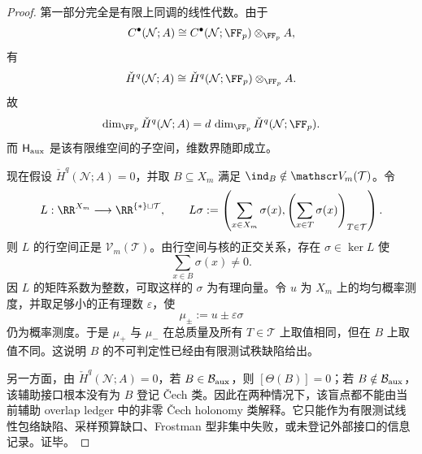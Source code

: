\begin{proof}
第一部分完全是有限上同调的线性代数。由于
\[
C^\bullet(\mathcal N;A)\cong C^\bullet(\mathcal N;\FF_p)\otimes_{\FF_p}A,
\]
有
\[
\check H^q(\mathcal N;A)\cong \check H^q(\mathcal N;\FF_p)\otimes_{\FF_p}A.
\]
故
\[
\dim_{\FF_p}\check H^q(\mathcal N;A)=d\,\dim_{\FF_p}\check H^q(\mathcal N;\FF_p).
\]
而 \(\mathsf H_{\rm aux}\) 是该有限维空间的子空间，维数界随即成立。

现在假设 \(\check H^q(\mathcal N;A)=0\)，并取 \(B\subseteq X_m\) 满足 \(\ind_B\notin\mathscr V_m(\mathcal T)\)。令
\[
L:\RR^{X_m}\longrightarrow \RR^{\{\ast\}\sqcup\mathcal T},\qquad
L\sigma:=\left(\sum_{x\in X_m}\sigma(x),\left(\sum_{x\in T}\sigma(x)\right)_{T\in\mathcal T}\right).
\]
则 \(L\) 的行空间正是 \(\mathscr V_m(\mathcal T)\)。由行空间与核的正交关系，存在 \(\sigma\in\ker L\) 使
\[
\sum_{x\in B}\sigma(x)\ne0.
\]
因 \(L\) 的矩阵系数为整数，可取这样的 \(\sigma\) 为有理向量。令 \(u\) 为 \(X_m\) 上的均匀概率测度，并取足够小的正有理数 \(\varepsilon\)，使
\[
\mu_\pm:=u\pm\varepsilon\sigma
\]
仍为概率测度。于是 \(\mu_+\) 与 \(\mu_-\) 在总质量及所有 \(T\in\mathcal T\) 上取值相同，但在 \(B\) 上取值不同。这说明 \(B\) 的不可判定性已经由有限测试秩缺陷给出。

另一方面，由 \(\check H^q(\mathcal N;A)=0\)，若 \(B\in\mathcal B_{\rm aux}\)，则 \([\Theta(B)]=0\)；若 \(B\notin\mathcal B_{\rm aux}\)，该辅助接口根本没有为 \(B\) 登记 \v Cech 类。因此在两种情况下，该盲点都不能由当前辅助 overlap ledger 中的非零 \v Cech holonomy 类解释。它只能作为有限测试线性包络缺陷、采样预算缺口、Frostman 型非集中失败，或未登记外部接口的信息记录。证毕。
\end{proof}

